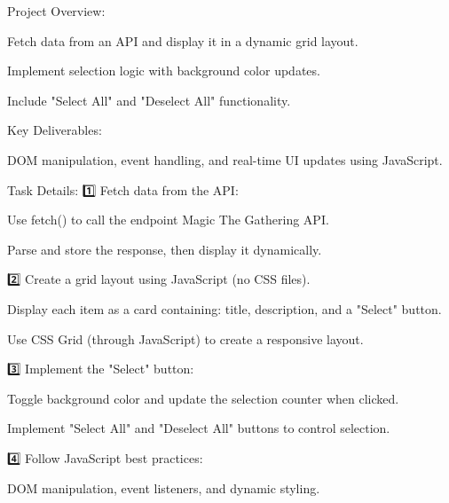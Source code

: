 Project Overview:

Fetch data from an API and display it in a dynamic grid layout.

Implement selection logic with background color updates.

Include "Select All" and "Deselect All" functionality.

Key Deliverables:

DOM manipulation, event handling, and real-time UI updates using JavaScript.

Task Details:
1️⃣ Fetch data from the API:

Use fetch() to call the endpoint Magic The Gathering API.

Parse and store the response, then display it dynamically.

2️⃣ Create a grid layout using JavaScript (no CSS files).

Display each item as a card containing: title, description, and a "Select" button.

Use CSS Grid (through JavaScript) to create a responsive layout.

3️⃣ Implement the "Select" button:

Toggle background color and update the selection counter when clicked.

Implement "Select All" and "Deselect All" buttons to control selection.

4️⃣ Follow JavaScript best practices:

DOM manipulation, event listeners, and dynamic styling.